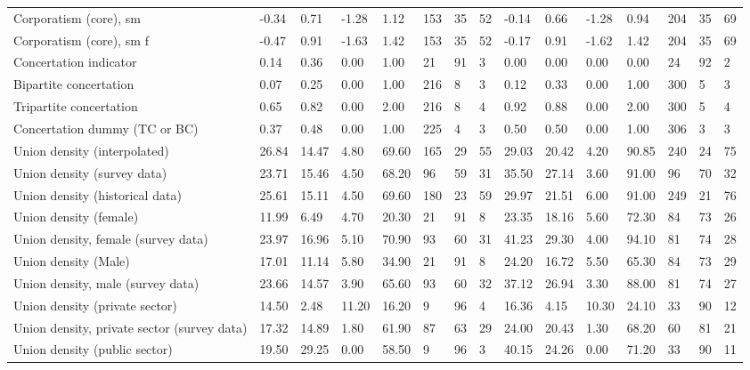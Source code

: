 \begin{longtable}{lllllllllllllll}
\addlinespace
Corporatism (core), sm & -0.34 & 0.71 & -1.28 & 1.12 & 153 & 35 & 52 & -0.14 & 0.66 & -1.28 & 0.94 & 204 & 35 & 69\\
Corporatism (core), sm f & -0.47 & 0.91 & -1.63 & 1.42 & 153 & 35 & 52 & -0.17 & 0.91 & -1.62 & 1.42 & 204 & 35 & 69\\
Concertation indicator & 0.14 & 0.36 & 0.00 & 1.00 & 21 & 91 & 3 & 0.00 & 0.00 & 0.00 & 0.00 & 24 & 92 & 2\\
Bipartite concertation & 0.07 & 0.25 & 0.00 & 1.00 & 216 & 8 & 3 & 0.12 & 0.33 & 0.00 & 1.00 & 300 & 5 & 3\\
Tripartite concertation & 0.65 & 0.82 & 0.00 & 2.00 & 216 & 8 & 4 & 0.92 & 0.88 & 0.00 & 2.00 & 300 & 5 & 4\\
\addlinespace
Concertation dummy (TC or BC) & 0.37 & 0.48 & 0.00 & 1.00 & 225 & 4 & 3 & 0.50 & 0.50 & 0.00 & 1.00 & 306 & 3 & 3\\
Union density (interpolated) & 26.84 & 14.47 & 4.80 & 69.60 & 165 & 29 & 55 & 29.03 & 20.42 & 4.20 & 90.85 & 240 & 24 & 75\\
Union density (survey data) & 23.71 & 15.46 & 4.50 & 68.20 & 96 & 59 & 31 & 35.50 & 27.14 & 3.60 & 91.00 & 96 & 70 & 32\\
Union density (historical data) & 25.61 & 15.11 & 4.50 & 69.60 & 180 & 23 & 59 & 29.97 & 21.51 & 6.00 & 91.00 & 249 & 21 & 76\\
Union density (female) & 11.99 & 6.49 & 4.70 & 20.30 & 21 & 91 & 8 & 23.35 & 18.16 & 5.60 & 72.30 & 84 & 73 & 26\\
\addlinespace
Union density, female (survey data) & 23.97 & 16.96 & 5.10 & 70.90 & 93 & 60 & 31 & 41.23 & 29.30 & 4.00 & 94.10 & 81 & 74 & 28\\
Union density (Male) & 17.01 & 11.14 & 5.80 & 34.90 & 21 & 91 & 8 & 24.20 & 16.72 & 5.50 & 65.30 & 84 & 73 & 29\\
Union density, male (survey data) & 23.66 & 14.57 & 3.90 & 65.60 & 93 & 60 & 32 & 37.12 & 26.94 & 3.30 & 88.00 & 81 & 74 & 27\\
Union density (private sector) & 14.50 & 2.48 & 11.20 & 16.20 & 9 & 96 & 4 & 16.36 & 4.15 & 10.30 & 24.10 & 33 & 90 & 12\\
Union density, private sector (survey data) & 17.32 & 14.89 & 1.80 & 61.90 & 87 & 63 & 29 & 24.00 & 20.43 & 1.30 & 68.20 & 60 & 81 & 21\\
\addlinespace
Union density (public sector) & 19.50 & 29.25 & 0.00 & 58.50 & 9 & 96 & 3 & 40.15 & 24.26 & 0.00 & 71.20 & 33 & 90 & 11\\

\end{longtable}
